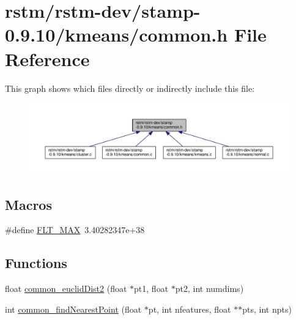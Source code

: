 \hypertarget{stamp-0_89_810_2kmeans_2common_8h}{\section{rstm/rstm-\/dev/stamp-\/0.9.10/kmeans/common.h File Reference}
\label{stamp-0_89_810_2kmeans_2common_8h}
}
This graph shows which files directly or indirectly include this file\-:
\nopagebreak
\begin{figure}[H]
\begin{center}
\leavevmode
\includegraphics[width=350pt]{stamp-0_89_810_2kmeans_2common_8h__dep__incl}
\end{center}
\end{figure}
\subsection*{Macros}
\begin{DoxyCompactItemize}
\item 
\#define \hyperlink{stamp-0_89_810_2kmeans_2common_8h_a7fbf1534f9e0f0bfdb86fb928902474c}{F\-L\-T\-\_\-\-M\-A\-X}~3.\-40282347e+38
\end{DoxyCompactItemize}
\subsection*{Functions}
\begin{DoxyCompactItemize}
\item 
float \hyperlink{stamp-0_89_810_2kmeans_2common_8h_a0a10c667c9a1be1376b896b5775baa03}{common\-\_\-euclid\-Dist2} (float $\ast$pt1, float $\ast$pt2, int numdims)
\item 
int \hyperlink{stamp-0_89_810_2kmeans_2common_8h_ad6ea568f35026465feabbf0512323704}{common\-\_\-find\-Nearest\-Point} (float $\ast$pt, int nfeatures, float $\ast$$\ast$pts, int npts)
\end{DoxyCompactItemize}


